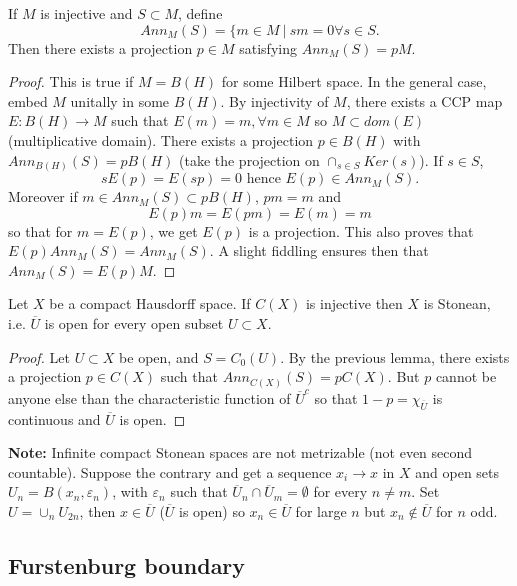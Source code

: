 \begin{lem} If $M$ is injective and $S\subset M$, define
\[Ann_M(S) = \{ m\in M \ | \ sm = 0 \forall s \in S.\]
Then there exists a projection $p\in M$ satisfying $Ann_M(S) = pM$.
\end{lem}

\begin{proof}
This is true if $M=B(H)$ for some Hilbert space. In the general case, embed $M$ unitally in some $B(H)$. By injectivity of $M$, there exists a CCP map $E: B(H)\rightarrow M$ such that $E(m)=m, \forall m\in M$ so $M\subset dom(E)$ (multiplicative domain). There exists a projection $p\in B(H)$ with $Ann_{B(H)}(S)= p B(H)$ (take the projection on $\cap_{s\in S} Ker(s)$). If $s\in S$, 
\[sE(p) = E(sp)= 0 \text{ hence }E(p)\in Ann_{M}(S).\]
Moreover if $m\in Ann_M(S)\subset pB(H) $, $pm = m$ and
\[E(p)m = E(pm) =E(m)=m\]
so that for $m=E(p)$, we get $E(p)$ is a projection. This also proves that $E(p)Ann_M(S) =Ann_M(S)$. A slight fiddling ensures then that $Ann_M(S)=E(p)M$.
\end{proof}

\begin{cor}
Let $X$ be a compact Hausdorff space. If $C(X)$ is injective then $X$ is Stonean, i.e. $\overline U$ is open for every open subset $U\subset X$.
\end{cor}

\begin{proof}
Let $U\subset X$ be open, and $S=C_0(U)$. By the previous lemma, there exists a projection $p\in C(X)$ such that $Ann_{C(X)}(S) = p C(X)$. But $p$ cannot be anyone else than the characteristic function of $\overline{U}^c$ so that $1-p =\chi_{\overline U}$ is continuous and $\overline U$ is open.
\end{proof}

\textbf{Note:} Infinite compact Stonean spaces are not metrizable (not even second countable). Suppose the contrary and get a sequence $x_i \rightarrow x$ in $X$ and open sets $U_n = B(x_n,\varepsilon_n)$, with $\varepsilon_n$ such that $\overline U_n \cap \overline U_m = \emptyset $ for every $n\neq m$. Set $U= \cup_{n}  U_{2n}$, then $x\in \overline U$ ($\overline U$ is open) so $x_n \in \overline U$ for large $n$ but $x_n \notin \overline U $ for $n$ odd.

\subsection{Furstenburg boundary}

